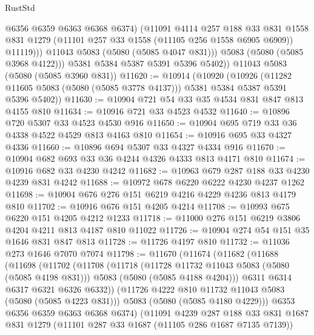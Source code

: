 \begin{lexlean}{RustStd}
\begin{coremodule}
{\begin{coremodule}
{{{{{                  @6356
                  @6359
                  @6363
                  @6368
                  @6374)
                (@11091
                  @4114
                  @257
                  @188
                  @33
                  @831
                  @1558
                  @831
                  @1279
                  (@11101 @257 @33 @1558 (@11105 @256 @1558 @6905 @6909))
                  @11119)))
            @11043
            @5083
            (@5080 (@5085 @4047 @831)))
          @5083
          (@5080 (@5085 @3968 @4122)))
        @5381
        @5384
        @5387
        @5391
        @5396
        @5402))
    @11043
    @5083
    (@5080 (@5085 @3960 @831))
@11620 := @10914
    (@10920
      (@10926
        (@11282 @11605 @5083 (@5080 (@5085 @3778 @4137)))
        @5381
        @5384
        @5387
        @5391
        @5396
        @5402))
@11630 := @10904 @721 @54 @33 @35 @4534 @831 @847 @813 @4155 @810
@11634 := @10916 @721 @33 @4523 @4532
@11640 := @10896 @720 @5307 @33 @4523 @4530 @916
@11650 := @10904 @695 @719 @33 @36 @4338 @4522 @4529 @813 @4163 @810
@11654 := @10916 @695 @33 @4327 @4336
@11660 := @10896 @694 @5307 @33 @4327 @4334 @916
@11670 := @10904 @682 @693 @33 @36 @4244 @4326 @4333 @813 @4171 @810
@11674 := @10916 @682 @33 @4230 @4242
@11682 := @10963 @679 @287 @188 @33 @4230 @4239 @831 @4242
@11688 := @10972 @678 @6220 @6222 @4230 @4237 @1262
@11698 := @10904 @676 @276 @151 @6219 @4216 @4229 @4236 @813 @4179 @810
@11702 := @10916 @676 @151 @4205 @4214
@11708 := @10993 @675 @6220 @151 @4205 @4212 @1233
@11718 := @11000 @276 @151 @6219 @3806 @4204 @4211 @813 @4187 @810 @11022
@11726 := @10904 @274 @54 @151 @35 @1646 @831 @847 @813
@11728 := @11726 @4197 @810
@11732 := @11036 @273 @1646 @7070 @7074
@11798 := @11670
    (@11674
      (@11682
        (@11688
          (@11698
            (@11702
              (@11708
                (@11718
                  (@11728 @11732 @11043 @5083 (@5080 (@5085 @4198 @831)))
                  @5083
                  (@5080 (@5085 @4188 @4204)))
                @6311
                @6314
                @6317
                @6321
                @6326
                @6332))
            (@11726 @4222 @810 @11732 @11043 @5083 (@5080 (@5085 @4223 @831)))
            @5083
            (@5080 (@5085 @4180 @4229)))
          @6353
          @6356
          @6359
          @6363
          @6368
          @6374)
        (@11091
          @4239
          @287
          @188
          @33
          @831
          @1687
          @831
          @1279
          (@11101 @287 @33 @1687 (@11105 @286 @1687 @7135 @7139))
}}}}}
\end{coremodule}}
\end{coremodule}
\end{lexlean}
